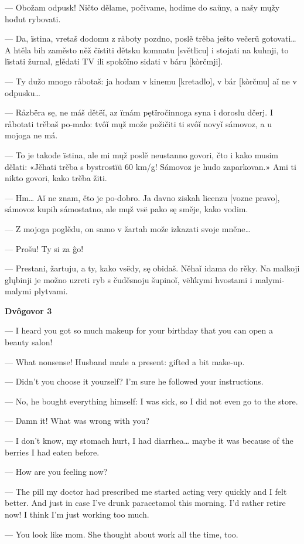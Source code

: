 — Obožam odpusk! Ničto dělame, počivame, hodime do saŭny, a našy mųžy hođut rybovati.

— Da, ïstina, vretaš dodomu z råboty pozdno, poslě trěba ješto večerü gotovati… A htěla bih zaměsto něž čïstiti dětsku komnatu [světlicu] i stojati na kuhnji, to lïstati žurnal, glědati TV ili spokôǐno sidati v báru [kòrčmji].

— Ty dužo mnogo råbotaš: ja hođam v kinemu [kretadlo], v bár [kòrčmu] aǐ ne v odpusku…

— Råzbëra sę, ne máš dětëǐ, az ïmám pętïročinnoga syna i doroslu dčerj. I råbotati trěbaš po-malo: tvôǐ mųž može požičiti ti svôǐ novyǐ sámovoz, a u mojoga ne má.

— To je takođe ïstina, ale mi mųž poslě neustanno govori, čto i kako musim dělati: «Jěhati trěba s bystrostïü 60 km/g! Sámovoz je hudo zaparkovan.» Ami ti nikto govori, kako trěba žiti.

— Hm… Aǐ ne znam, čto je po-dobro. Ja davno ziskah licenzu [vozne pravo], sámovoz kupih sámostatno, ale mųž vsë pako sę směje, kako vodim.

— Z mojoga poglědu, on samo v žartah može izkazati svoje mněne…

— Prošu! Ty si za ĝo!

— Prestani, žartuju, a ty, kako vsëdy, sę obidaš. Něhaǐ idama do rěky. Na malkoji glųbinji je možno uzreti ryb s čuděsnoju šupinoǐ, vëlïkymi hvostami i malymi-malymi plytvami.


\textbf{Dvôgovor 3}


— I heard you got so much makeup for your birthday that you can open a beauty salon!

— What nonsense! Husband made a present: gifted a bit make-up.

— Didn’t you choose it yourself? I’m sure he followed your instructions.

— No, he bought everything himself: I was sick, so I did not even go to the store.

— Damn it! What was wrong with you?

— I don’t know, my stomach hurt, I had diarrhea… maybe it was because of the berries I had eaten before.

— How are you feeling now?

— The pill my doctor had prescribed me started acting very quickly and I felt better. And just in case I’ve drunk paracetamol this morning. I’d rather retire now! I think I’m just working too much.

— You look like mom. She thought about work all the time, too.

